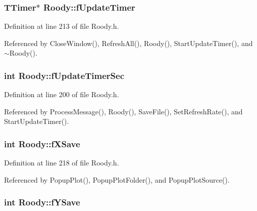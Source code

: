 \subsubsection[{fUpdateTimer}]{\setlength{\rightskip}{0pt plus 5cm}TTimer$\ast$ {\bf Roody::fUpdateTimer}\hspace{0.3cm}{\ttfamily  [private]}}\label{classRoody_acb20e66b8aab14851d46f34c10ad10bd}


Definition at line 213 of file Roody.h.



Referenced by CloseWindow(), RefreshAll(), Roody(), StartUpdateTimer(), and $\sim$Roody().

\subsubsection[{fUpdateTimerSec}]{\setlength{\rightskip}{0pt plus 5cm}int {\bf Roody::fUpdateTimerSec}\hspace{0.3cm}{\ttfamily  [private]}}\label{classRoody_acc9f0ce284066a96baff96bf9f0447ae}


Definition at line 200 of file Roody.h.



Referenced by ProcessMessage(), Roody(), SaveFile(), SetRefreshRate(), and StartUpdateTimer().

\subsubsection[{fXSave}]{\setlength{\rightskip}{0pt plus 5cm}int {\bf Roody::fXSave}\hspace{0.3cm}{\ttfamily  [private]}}\label{classRoody_a73898787ac0e2fa150fcad2d32b1251c}


Definition at line 218 of file Roody.h.



Referenced by PopupPlot(), PopupPlotFolder(), and PopupPlotSource().

\subsubsection[{fYSave}]{\setlength{\rightskip}{0pt plus 5cm}int {\bf Roody::fYSave}\hspace{0.3cm}{\ttfamily  [private]}}\label{classRoody_a186ab72676dda716ee613e7b79041feb}


